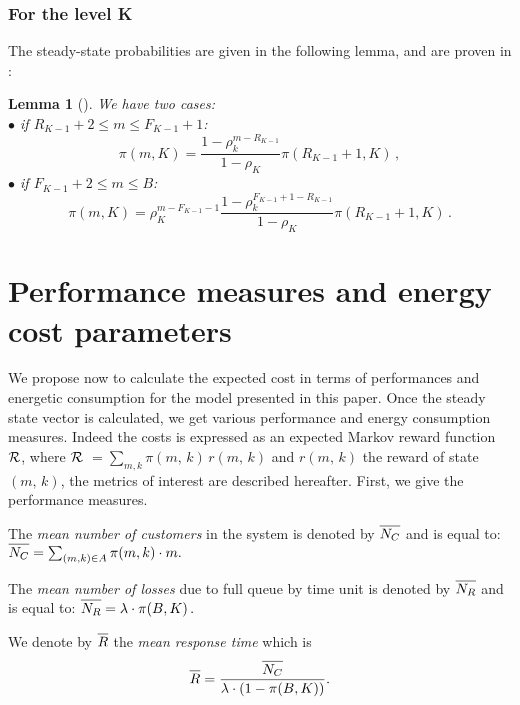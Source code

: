 \documentclass[conference]{IEEEtran}
\newtheorem{lem}{Lemma}
\begin{document}
\subsubsection{For the level K}
The steady-state probabilities are given in the following lemma, and are proven
in \cite{le2000simple}:
\begin{lem}[\cite{le2000simple}]
We have two cases:\\
$\bullet$ if $R_{K-1}+2 \leq m \leq F_{K-1}+1 $:
\begin{equation}
\pi(m,K)=\frac{1-\rho_k^{m-R_{K-1}}}{1-\rho_K} \pi(R_{K-1}+1,K) \, ,
\label{eq60}
\end{equation}
$\bullet$ if $F_{K-1}+2 \leq m \leq B$:
\begin{equation}
\pi(m,K)=\rho_K^{m-F_{K-1}-1} \frac{1-\rho_k^{F_{K-1}+1-R_{K-1}}}{1-\rho_K} \pi(R_{K-1}+1,K) \, .
\label{eq61}
\end{equation}
\end{lem}


\section{Performance measures and energy cost parameters}
\label{sec:ParamPerf}

We propose now to calculate the expected cost in terms of performances and energetic consumption
for the model presented in this paper.  Once the steady state vector is calculated, we get various performance and energy consumption measures.
Indeed the costs is expressed as an expected Markov reward
function $\cal{R}$, where $\cal{R}$ $=\sum_{m,k}\pi(m,\,k) \,r(m,\,k)$  and
$r(m,\,k)$ the reward of state $(m,\,k)$, the  metrics of interest are described hereafter.
First, we give the performance measures.


The \emph{mean number of customers} in the system is denoted by $\overline{\mathstrut N_{C}}$ and is equal to:
\(
\overline{\mathstrut N_{C}}=\sum_{(m,k) \in A} \pi(m,k) \cdot m.
\)

The \emph{mean number of losses} due to full queue by time unit
is denoted by $\overline{\mathstrut N_{R}}$ and is equal to:
\(
    \overline{\mathstrut N_{R}}=\lambda \cdot \pi(B,K) \, .
\)

We denote by $\overline{\mathstrut R}$ the \emph{mean response time} which is
\begin{equation*}
    \overline{\mathstrut R}=\frac{\overline{\mathstrut N_{C}}}{\lambda \cdot (1-\pi(B,K))}.
\end{equation*}
\end{document}
